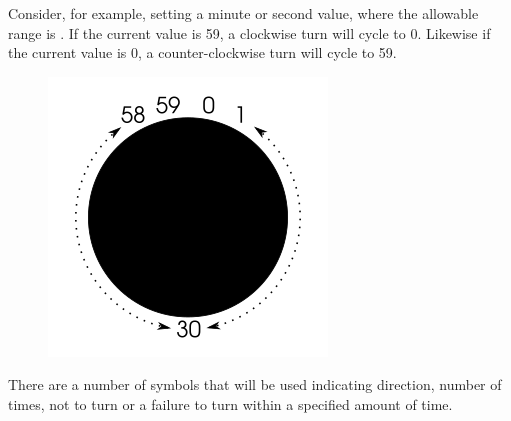 \par\medskip

Consider, for example, setting a minute or second value, where the allowable
range is .  If the current value is \num{59}, a clockwise turn will
cycle to \num{0}.  Likewise if the current value is \num{0}, a counter-clockwise
turn will cycle to \num{59}.

\begin{figure}[H]
\centering
  \includegraphics{images/settings_knob_wrap_example.png}
\end{figure}


\par\medskip

There are a number of symbols that will be used indicating direction, number of
times, not to turn or a failure to turn within a specified amount of time.

